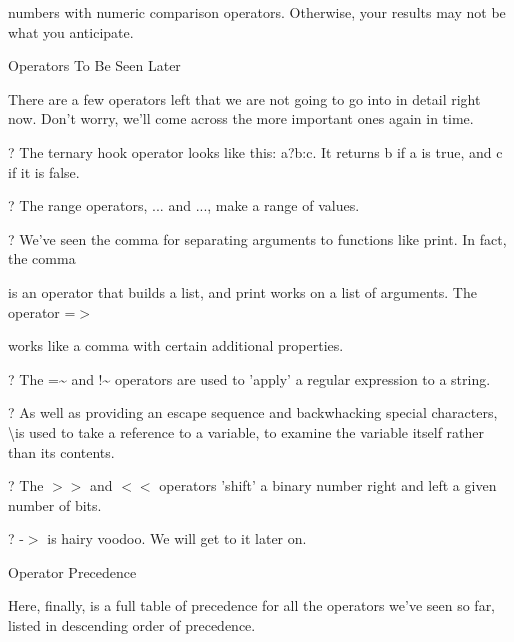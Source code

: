 \documentclass[a4paper,11pt]{book}
\begin{document}
\noindent numbers with numeric comparison operators. Otherwise, your results may not be what you anticipate.

\noindent 

\noindent 

\noindent Operators To Be Seen Later

\noindent 

\noindent There are a few operators left that we are not going to go into in detail right now. Don't worry, we'll come across the more important ones again in time.

\noindent 

\noindent ? The ternary hook operator looks like this: a?b:c. It returns b if a is true, and c if it is false.

\noindent 

\noindent ? The range operators, ... and ..., make a range of values.

\noindent 

\noindent ? We've seen the comma for separating arguments to functions like print. In fact, the comma

\noindent is an operator that builds a list, and print works on a list of arguments. The operator =$>$

\noindent works like a comma with certain additional properties.

\noindent 

\noindent ? The =\~{} and !\~{} operators are used to 'apply' a regular expression to a string.

\noindent 

\noindent ? As well as providing an escape sequence and backwhacking special characters, \textbackslash  is used to take a reference to a variable, to examine the variable itself rather than its contents.

\noindent 

\noindent ? The $>$$>$ and $<$$<$ operators 'shift' a binary number right and left a given number of bits.

\noindent 

\noindent ? -$>$ is hairy voodoo. We will get to it later on.

\noindent 

\noindent 

\noindent Operator Precedence

\noindent 

\noindent Here, finally, is a full table of precedence for all the operators we've seen so far, listed in descending order of precedence.
\end{document}

